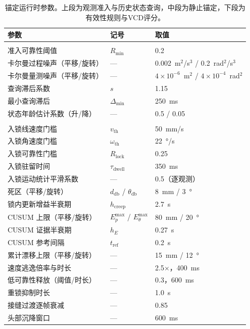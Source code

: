\begin{table}[t]
\centering
\caption{锚定运行时参数。上段为观测准入与历史状态查询，中段为静止锚定，下段为有效性规则与VCD评分。}
\label{tab:appendix-params}
\small
\setlength{\tabcolsep}{3.4pt}
\begin{tabularx}{\columnwidth}{@{}>{\raggedright\arraybackslash}Xll@{}}
\toprule
参数 & 记号 & 取值 \\
\midrule
\multicolumn{3}{@{}l}{\emph{观测准入与历史状态查询}} \\
准入可靠性阈值 & $R_{\min}$ & 0.2 \\
卡尔曼过程噪声（平移/旋转） & --- & 0.002~m$^2$/s$^3$ / 0.2~rad$^2$/s$^3$ \\
卡尔曼量测噪声（平移/旋转） & --- & $4\times10^{-6}$~m$^2$ / $4\times10^{-4}$~rad$^2$ \\
查询滞后系数 & $s$ & 1.15 \\
最小查询滞后 & $\Delta_{\min}$ & 250~ms \\
状态年龄估计系数（升/降） & --- & 0.5 / 0.05 \\
\midrule
\multicolumn{3}{@{}l}{\emph{静止锚定（StaticLock）}} \\
入锁线速度门槛 & $v_{\mathrm{th}}$ & 50~mm/s \\
入锁角速度门槛 & $\omega_{\mathrm{th}}$ & 22~°/s \\
入锁可靠性门槛 & $R_{\mathrm{lock}}$ & 0.25 \\
入锁驻留时间 & $\tau_{\mathrm{dwell}}$ & 350~ms \\
入锁运动统计平滑系数 & --- & 0.5（逐观测） \\
死区（平移/旋转） & $d_{\mathrm{db}}$ / $\theta_{\mathrm{db}}$ & 8~mm / 3~° \\
锁内更新增益半衰期 & $h_{\mathrm{creep}}$ & 2.7~s \\
CUSUM 上限（平移/旋转） & $E_p^{\max}$ / $E_\theta^{\max}$ & 80~mm / 20~° \\
CUSUM 证据半衰期 & $h_E$ & 0.27~s \\
CUSUM 参考间隔 & $t_{\mathrm{ref}}$ & 0.2~s \\
累计漂移上限（平移/旋转） & --- & 15~mm / 12~° \\
速度逃逸倍率与时长 & --- & 2.5$\times$，400~ms \\
低可靠性释放（阈值/时长） & --- & 0.3，600~ms \\
重锁抑制时长 & --- & 1.0~s \\
接缝过渡逐帧衰减 & --- & 0.85 \\
头部沉降窗口 & --- & 600~ms \\

\end{tabularx}
\end{table}
